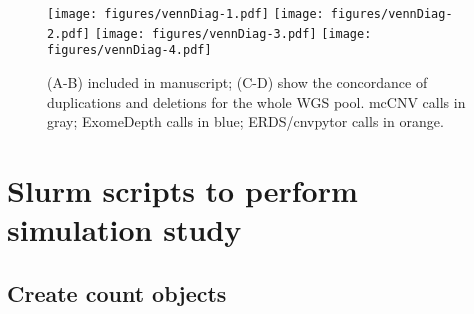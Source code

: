 \documentclass{article}\usepackage[]{graphicx}\usepackage[]{color}
\begin{document}
\begin{figure}
  \centering
  \texttt{[image: figures/vennDiag-1.pdf]}%
  \texttt{[image: figures/vennDiag-2.pdf]}
  \texttt{[image: figures/vennDiag-3.pdf]}%
  \texttt{[image: figures/vennDiag-4.pdf]}
  \caption{(A-B) included in manuscript; (C-D) show the concordance of duplications and deletions for the whole WGS pool. mcCNV calls in gray; ExomeDepth calls in blue; ERDS/cnvpytor calls in orange.}
\end{figure}

\section{Slurm scripts to perform simulation study}

\subsection{Create count objects}
\end{document}
